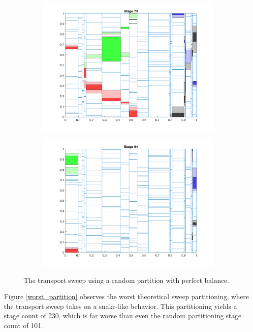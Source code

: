 \documentclass[11pt, letterpaper,titlepage,oneside]{article}
\begin{document}
\begin{figure}[H]
\begin{subfigure}{0.49\textwidth}
  \includegraphics[scale=0.5]{../figures/random_partition_3.png}
  \end{subfigure}
  \begin{subfigure}{0.49\textwidth}
  \includegraphics[scale=0.5]{../figures/random_partition_4.png}
  \end{subfigure}
  \caption{The transport sweep using a random partition with perfect balance.}
  \label{random_partition}
\end{figure}

Figure \ref{worst_partition} observes the worst theoretical sweep partitioning, where the transport sweep takes on a snake-like behavior. This partitioning yields a stage count of 230, which is far worse than even the random partitioning stage count of 101.
\end{document}
